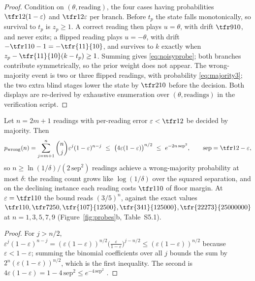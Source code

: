 \begin{proof}
Condition on $(\theta,\text{reading})$, the four cases having probabilities $\tfr12(1-\varepsilon)$ and $\tfr12\varepsilon$ per branch. Before $t_p$ the state falls monotonically, so survival to $t_p$ is $z_p\ge1$. A correct reading then plays $u=\theta$, with drift $\tfr9{10}$, and never exits; a flipped reading plays $u=-\theta$, with drift $-\tfr1{10}-1=-\tfr{11}{10}$, and survives to $k$ exactly when $z_p-\tfr{11}{10}(k-t_p)\ge1$. Summing gives \eqref{eq:noisyprobe}; both branches contribute symmetrically, so the prior weight does not appear. The wrong-majority event is two or three flipped readings, with probability \eqref{eq:majority3}; the two extra blind stages lower the state by $\tfr2{10}$ before the decision. Both displays are re-derived by exhaustive enumeration over $(\theta,\text{readings})$ in the verification script.
\end{proof}

\begin{proposition}\label{prop:probecount}
Let $n=2m+1$ readings with per-reading error $\varepsilon<\tfr12$ be decided by majority. Then
\begin{equation}\label{eq:probecount}
p_{\mathrm{wrong}}(n)=\sum_{j=m+1}^{n}\binom nj\varepsilon^{j}(1-\varepsilon)^{n-j}\ \le\ \bigl(4\varepsilon(1-\varepsilon)\bigr)^{n/2}\ \le\ e^{-2n\,\mathrm{sep}^{2}},\qquad \mathrm{sep}=\tfr12-\varepsilon,
\end{equation}
so $n\ge\ln(1/\delta)/(2\,\mathrm{sep}^{2})$ readings achieve a wrong-majority probability at most $\delta$: the reading count grows like $\log(1/\delta)$ over the squared separation, and on the declining instance each reading costs $\tfr1{10}$ of floor margin. At $\varepsilon=\tfr1{10}$ the bound reads $(3/5)^{n}$, against the exact values $\tfr1{10},\tfr7{250},\tfr{107}{12500},\tfr{341}{125000},\tfr{22273}{25000000}$ at $n=1,3,5,7,9$ (Figure~\ref{fig:probes}b, Table~S5.1).
\end{proposition}

\begin{proof}
For $j>n/2$, $\varepsilon^{j}(1-\varepsilon)^{n-j}=(\varepsilon(1-\varepsilon))^{n/2}\bigl(\tfrac{\varepsilon}{1-\varepsilon}\bigr)^{j-n/2}\le(\varepsilon(1-\varepsilon))^{n/2}$ because $\varepsilon<1-\varepsilon$; summing the binomial coefficients over all $j$ bounds the sum by $2^{n}(\varepsilon(1-\varepsilon))^{n/2}$, which is the first inequality. The second is $4\varepsilon(1-\varepsilon)=1-4\,\mathrm{sep}^{2}\le e^{-4\,\mathrm{sep}^{2}}$ \cite{Hoeffding1963}.
\end{proof}

